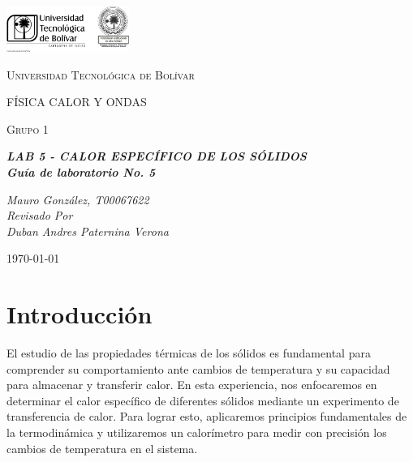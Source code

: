 \documentclass[twocolumn, 12pt]{article}
\begin{document}
\begin{titlepage}
    \centering
    \includegraphics[width=0.3\textwidth]{Images/logo_utb.png}\par\vspace{1cm}
    {\scshape\LARGE Universidad Tecnológica de Bolívar \par}
    \vspace{1cm}

    {\scshape\Large FÍSICA CALOR Y ONDAS \par}
    \vspace{.2cm}

    {\scshape\Large Grupo 1 \par}
    \vspace{1cm}
    \slshape {\Large \bfseries{}LAB 5 - CALOR ESPECÍFICO DE LOS SÓLIDOS\\}
    \slshape {\small \bfseries{} Guía de laboratorio No. 5}
    \vspace{4cm}

    \slshape {\itshape{} Mauro González, T00067622 \\}
    \vfill
    Revisado Por \\
    Duban Andres Paternina Verona\\
    {\large \today\par}
\end{titlepage}

\section{Introducción}

El estudio de las propiedades térmicas de los sólidos es
fundamental para comprender su comportamiento ante cambios
de temperatura y su capacidad para almacenar y transferir
calor. En esta experiencia, nos enfocaremos en determinar
el calor específico de diferentes sólidos mediante un
experimento de transferencia de calor. Para lograr esto,
aplicaremos principios fundamentales de la termodinámica y
utilizaremos un calorímetro para medir con precisión los
cambios de temperatura en el sistema.
\end{document}
